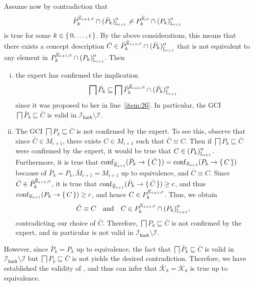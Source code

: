 \begin{Proof}
  Assume now by contradiction that
  \begin{equation*}
    \bar P_{k}^{\bar{{\mathbb{K}}}_{i+1}, c} \cap (\bar P_{k})_{{\mathbb{L}}_{i+1}}'' \neq
    P_{k}^{\bar{{\mathbb{K}}}, c} \cap (P_{k})_{{\mathbb{L}}_{i+1}}''
  \end{equation*}
  is true for some $k \in {\ensuremath{\{\, 0, \dots, i \,\}}}$.  By the above considerations, this means
  that there exists a concept description $\bar C \in \bar P_{k}^{\bar{{\mathbb{K}}}_{i+1}, c}
  \cap (\bar P_{k})_{\bar{{\mathbb{L}}}_{i+1}}''$ that is not equivalent to any element in
  $P_{k}^{{\mathbb{K}}_{i+1}, c} \cap (P_{k})_{{\mathbb{L}}_{i+1}}''$.  Then
  \begin{enumerate}[i. ]
  \item the expert has confirmed the implication
    \begin{equation*}
      \bigsqcap \bar P_{k} \sqsubseteq \bigsqcap \bar P_{k}^{\bar{{\mathbb{K}}}_{i+1}, c} \cap
      (\bar P_{k})_{\bar{{\mathbb{L}}}_{i+1}}''
    \end{equation*}
    since it was proposed to her in line~\ref{item:26}.  In particular, the GCI $\bigsqcap
    \bar P_{k} \sqsubseteq \bar C$ is valid in $\mathcal{I}_{\mathsf{back}} \setminus
    \mathcal{I}$.
  \item The GCI $\bigsqcap P_{k} \sqsubseteq \bar C$ is not confirmed by the expert.  To
    see this, observe that since $\bar C \in M_{i+1}$, there exists $C \in M_{i+1}$ such
    that $\bar C \equiv C$.  Then if $\bigsqcap P_{k} \sqsubseteq \bar C$ were confirmed
    by the expert, it would be true that $C \in (P_{k})_{{\mathbb{L}}_{i+1}}''$.  Furthermore,
    it is true that $\operatorname{conf}_{\bar{{\mathbb{K}}}_{i+1}}(\bar P_{k} \to {\ensuremath{\{\, \bar C \,\}}}) =
    \operatorname{conf}_{{\mathbb{K}}_{i+1}}(P_{k} \to {\ensuremath{\{\, C \,\}}})$ because of $\bar P_{k} = P_{k}, \bar
    M_{i+1} = M_{i+1}$ up to equivalence, and $\bar C \equiv C$.  Since $\bar C \in \bar
    P_{k}^{\bar{{\mathbb{K}}}_{i+1}, c}$, it is true that $\operatorname{conf}_{\bar{{\mathbb{K}}}_{i+1}}(\bar P_{k}
    \to {\ensuremath{\{\, \bar C \,\}}}) \ge c$, and thus $\operatorname{conf}_{{\mathbb{K}}_{i+1}}(P_{k} \to {\ensuremath{\{\, C \,\}}}) \ge
    c$, and hence $C \in P_{k}^{{\mathbb{K}}_{i+1}, c}$.  Thus, we obtain
    \begin{equation*}
      \bar C \equiv C \quad\text{and}\quad C \in P_{k}^{{\mathbb{K}}_{i+1}, c} \cap
      (P_{k})_{{\mathbb{L}}_{i+1}}'',
    \end{equation*}
    contradicting our choice of $\bar C$.  Therefore, $\bigsqcap P_{k} \sqsubseteq \bar C$
    is not confirmed by the expert, and in particular is not valid in
    $\mathcal{I}_{\mathsf{back}} \setminus \mathcal{I}$.
  \end{enumerate}
  However, since $\bar P_{k} = P_{k}$ up to equivalence, the fact that $\bigsqcap \bar
  P_{k} \sqsubseteq \bar C$ is valid in $\mathcal{I}_{\mathsf{back}} \setminus
  \mathcal{I}$ but $\bigsqcap P_{k} \sqsubseteq \bar C$ is not yields the desired
  contradiction.  Therefore, we have established the validity of , and thus
  can infer that $\bar{\mathcal{K}}_{k} = \mathcal{K}_{k}$ is true up to equivalence.


\end{Proof}
